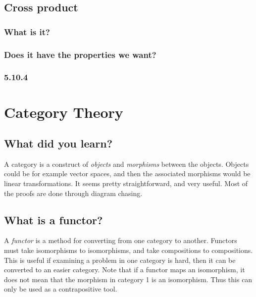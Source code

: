 \documentclass[12pt]{amsart}
\begin{document}
\subsection{Cross product}%
\label{sub:cross_product}

\subsubsection{What is it?}%
\label{ssub:what_is_it_}

\subsubsection{Does it have the properties we want?}%
\label{ssub:does_it_have_the_properties_we_want_}

\subsubsection{5.10.4}%
\label{ssub:5_10_4}

\section{Category Theory}%
\label{sec:category_theory}

\subsection{What did you learn?}%
\label{sub:what_did_you_learn_}

A category is a construct of \textit{objects} and \textit{morphisms} between
the objects. Objects could be for example vector spaces, and then the
associated morphisms would be linear transformations. It seems pretty
straightforward, and very useful. Most of the proofs are done through diagram
chasing.

\subsection{What is a functor?}%
\label{sub:what_is_a_functor_}

A \textit{functor} is a method for converting from one category to another.
Functors must take isomorphisms to isomorphisms, and take compositions to
compositions. This is useful if examining a problem in one category is hard,
then it can be converted to an easier category. Note that if a functor maps an
isomorphism, it does not mean that the morphism in category 1 is an
isomorphism. Thus this can only be used as a contrapositive tool.

\end{document}
